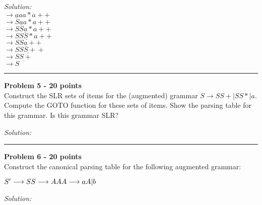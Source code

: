 \documentclass[a4paper, 11pt]{article}
\newenvironment{problem}[2][Problem]
    { \begin{mdframed}[backgroundcolor=gray!20] \textbf{#1 #2} \\}
    {  \end{mdframed}}
\newenvironment{solution}
    {\textit{Solution:}}
    {}
\begin{document}
\begin{solution}\\
    $\rightarrow \underline{a}aa*a++$\\
    $\rightarrow S\underline{a}a*a++$\\
    $\rightarrow SS\underline{a}*a++$\\
    $\rightarrow S\underline{SS*}a++$\\
    $\rightarrow SS\underline{a}++$\\
    $\rightarrow S\underline{SS+}+$\\
    $\rightarrow \underline{SS+}$\\
    $\rightarrow S$\\
\end{solution}
\noindent\rule{7in}{2.8pt}

\begin{problem}{5 - 20 points}
Construct the SLR sets of items for the (augmented) grammar $S  \longrightarrow SS+ | SS* | a $. Compute the GOTO function for these sets of items. Show the parsing table for this grammar. Is this grammar SLR?

\end{problem}

\begin{solution}

\end{solution}
\noindent\rule{7in}{2.8pt}

\begin{problem}{6 - 20 points}
Construct the canonical parsing table for the following augmented grammar:

\noindent $S'  \longrightarrow S \\
    S \longrightarrow AA \\
    A \longrightarrow a A | b $\\

\end{problem}

\begin{solution}

\end{solution}
\end{document}
